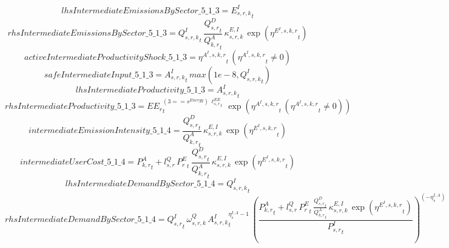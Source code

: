 \begin{dmath*}
lhsIntermediateEmissionsBySector\_5\_1\_3 = {{E^I_{s,r,k}}}_{t}
\end{dmath*}
\begin{dmath*}
rhsIntermediateEmissionsBySector\_5\_1\_3 = {{Q^{I}_{s,r,k}}}_{t}\, \frac{{{Q^{D}_{s,r}}}_{t}}{{{Q^{A}_{k,r}}}_{t}}\, {{\kappa^{E,I}_{s,r,k}}}\, \exp\left({{\eta^{E^{I},s,k,r}}}_{t}\right)
\end{dmath*}
\begin{dmath*}
activeIntermediateProductivityShock\_5\_1\_3 = {{\eta^{A^{I},s,k,r}}}_{t}\, \left({{\eta^{A^{I},s,k,r}}}_{t}\neq 0\right)
\end{dmath*}
\begin{dmath*}
safeIntermediateInput\_5\_1\_3 = {{A^{I}_{s,r,k}}}_{t}\, max(1e-8,{{Q^{I}_{s,r,k}}}_{t})
\end{dmath*}
\begin{dmath*}
lhsIntermediateProductivity\_5\_1\_3 = {{A^{I}_{s,r,k}}}_{t}
\end{dmath*}
\begin{dmath*}
rhsIntermediateProductivity\_5\_1\_3 = {{EE_r}}_{t}^{\left(3=={{s^{Energy}}}\right)\, {{\ell^{EE}_{s,r}}}_{t}}\, \exp\left({{\eta^{A^{I},s,k,r}}}_{t}\, \left({{\eta^{A^{I},s,k,r}}}_{t}\neq 0\right)\right)
\end{dmath*}
\begin{dmath*}
intermediateEmissionIntensity\_5\_1\_4 = \frac{{{Q^{D}_{s,r}}}_{t}}{{{Q^{A}_{k,r}}}_{t}}\, {{\kappa^{E,I}_{s,r,k}}}\, \exp\left({{\eta^{E^{I},s,k,r}}}_{t}\right)
\end{dmath*}
\begin{dmath*}
intermediateUserCost\_5\_1\_4 = {{P^{A}_{k,r}}}_{t}+{{l^{Q}_{s,r}}}\, {{P^E_r}}_{t}\, \frac{{{Q^{D}_{s,r}}}_{t}}{{{Q^{A}_{k,r}}}_{t}}\, {{\kappa^{E,I}_{s,r,k}}}\, \exp\left({{\eta^{E^{I},s,k,r}}}_{t}\right)
\end{dmath*}
\begin{dmath*}
lhsIntermediateDemandBySector\_5\_1\_4 = {{Q^{I}_{s,r,k}}}_{t}
\end{dmath*}
\begin{dmath*}
rhsIntermediateDemandBySector\_5\_1\_4 = {{Q^{I}_{s,r}}}_{t}\, {{\omega^{Q}_{s,r,k}}}\, {{A^{I}_{s,r,k}}}_{t}^{{{\eta^{I,A}_{s}}}-1}\, \left(\frac{{{P^{A}_{k,r}}}_{t}+{{l^{Q}_{s,r}}}\, {{P^E_r}}_{t}\, \frac{{{Q^{D}_{s,r}}}_{t}}{{{Q^{A}_{k,r}}}_{t}}\, {{\kappa^{E,I}_{s,r,k}}}\, \exp\left({{\eta^{E^{I},s,k,r}}}_{t}\right)}{{{P^{I}_{s,r}}}_{t}}\right)^{\left(-{{\eta^{I,A}_{s}}}\right)}
\end{dmath*}
